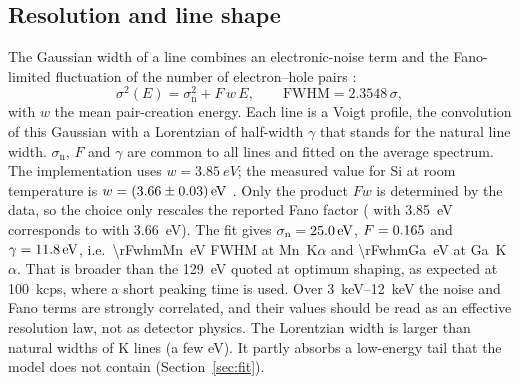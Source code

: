 \documentclass[11pt,a4paper]{article}
\begin{document}
\subsection{Resolution and line shape}
The Gaussian width of a line combines an electronic-noise term and the Fano-limited fluctuation of the
number of electron--hole pairs \citep{Fano1947,Knoll2010}:
\begin{equation}
\sigma^2(E) = \sigma_\mathrm{n}^2 + F\,w\,E,\qquad \mathrm{FWHM} = 2.3548\,\sigma,
\label{eq:resolution}
\end{equation}
with $w$ the mean pair-creation energy. Each line is a Voigt profile, the convolution of this Gaussian
with a Lorentzian of half-width $\gamma$ that stands for the natural line width. $\sigma_\mathrm{n}$,
$F$ and $\gamma$ are common to all lines and fitted on the average spectrum.
The implementation uses $w=\qty{3.85}{eV}$; the measured value for Si at room temperature is
$w=\qty{3.66\pm0.03}{eV}$ \citep{Scholze1998}. Only the product $Fw$ is determined by the data, so the
choice only rescales the reported Fano factor (\rFano{} with \qty{3.85}{eV} corresponds to \rFanoW{}
with \qty{3.66}{eV}).
The fit gives $\sigma_\mathrm{n}=\qty{25.0}{eV}$, $F=0.165$ and $\gamma=\qty{11.8}{eV}$, i.e.\
\qty{\rFwhmMn}{eV} FWHM at Mn~K$\alpha$ and \qty{\rFwhmGa}{eV} at Ga~K$\alpha$. That is broader than
the \qty{129}{eV} quoted at optimum shaping, as expected at \qty{100}{kcps}, where a short peaking
time is used. Over \qtyrange{3}{12}{keV} the noise and Fano terms are strongly correlated, and their
values should be read as an effective resolution law, not as detector physics. The Lorentzian width is
larger than natural widths of K lines (a few eV). It partly absorbs a low-energy tail that the model
does not contain (Section~\ref{sec:fit}).
\end{document}
